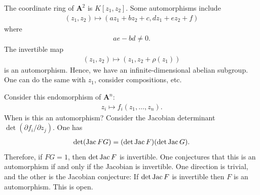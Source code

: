 \documentclass [11 pt, oneside] {article}
\begin{document}
\begin{example}\label{}
The coordinate ring of $\mathbf{A}^2$ is $K[z_1,z_2]$. Some automorphisms include 
\begin{align*}
	(z_1,z_2)\longmapsto (az_1+bz_2+c, dz_1+ez_2+f) 
\end{align*}
where
\begin{align*}
	ae - bd \ne 0.
\end{align*}
The invertible map
\begin{align*}
	(z_1,z_2)\longmapsto  (z_1,z_2+\rho(z_1))
\end{align*}
is an automorphism. Hence, we have an infinite-dimensional abelian subgroup. One can do the same with $z_1$, consider compositions, etc. 
\end{example}

\begin{example}\label{}
Consider this endomorphism of $\mathbf{A}^n$:
\begin{align*}
	z_i\longmapsto f_i(z_1,\hdots, z_n).
\end{align*}
When is this an automorphism? Consider the Jacobian determinant $\det (\partial f_i/\partial z_j)$. One has
\begin{align*}
	\det (\operatorname{Jac} FG) =  (\det \operatorname{Jac} F) (\det \operatorname{Jac} G).
\end{align*}
Therefore, if $FG = 1$, then $\det\operatorname{Jac} F$ is invertible. One conjectures that this is an automorphism if and only if the Jacobian is invertible. One direction is trivial, and the other is the Jacobian conjecture: If $\det \operatorname{Jac} F$ is invertible then $F$ is an automorphism. This is open.
\end{example}
\end{document}
